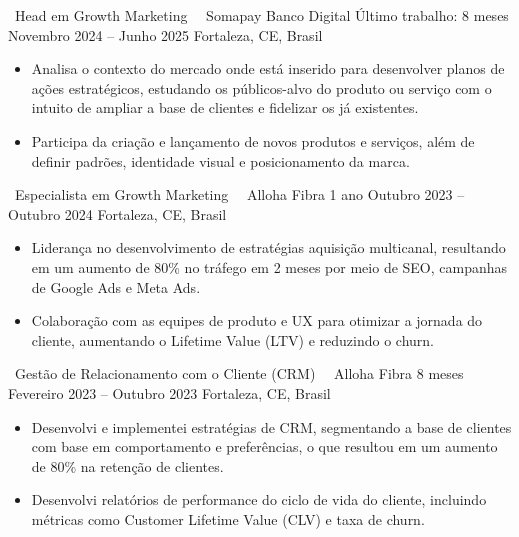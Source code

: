 
\cvevent
{\faPortrait\ Head em Growth Marketing\ \hfill \faAddressCard}
{\faDiscourse\ Somapay Banco Digital \hfill Último trabalho: 8 meses}
{Novembro 2024 -- Junho 2025}
{Fortaleza, CE, Brasil}
\begin{itemize}[leftmargin=*,itemsep=0.5em,topsep=0.5em]
	\item Analisa o contexto do mercado onde está inserido para desenvolver planos de ações estratégicos, estudando os públicos-alvo do produto ou serviço com o intuito de ampliar a base de clientes e fidelizar os já existentes.
	\item Participa da criação e lançamento de novos produtos e serviços, além de definir padrões, identidade visual e posicionamento da marca.
\end{itemize}
\divider
\cvevent
{\faChartLine\ Especialista em Growth Marketing\ \hfill \faAddressCard}
{\faQuinscape\ Alloha Fibra \hfill 1 ano}
{Outubro 2023 -- Outubro 2024}
{Fortaleza, CE, Brasil}
\begin{itemize}[leftmargin=*,itemsep=0.5em,topsep=0.5em]
	\item Liderança no desenvolvimento de estratégias aquisição multicanal,
	resultando em um aumento de 80\% no tráfego em 2 meses por meio de
	SEO, campanhas de Google Ads e Meta Ads.
	\item Colaboração com as equipes de produto e UX para otimizar a jornada do
	cliente, aumentando o Lifetime Value (LTV) e reduzindo o churn.
\end{itemize}
\divider
\cvevent
{\faHandshake[regular]\ Gestão de Relacionamento com o Cliente (CRM)\ \hfill \faAddressCard}
{\faQuinscape\ Alloha Fibra \hfill 8 meses}
{Fevereiro 2023 -- Outubro 2023}
{Fortaleza, CE, Brasil}
\begin{itemize}[leftmargin=*,itemsep=0.5em,topsep=0.5em]
	\item Desenvolvi e implementei estratégias de CRM, segmentando a base de
	clientes com base em comportamento e preferências, o que resultou em
	um aumento de 80\% na retenção de clientes.
	\item Desenvolvi relatórios de performance do ciclo de vida do cliente, incluindo
	métricas como Customer Lifetime Value (CLV) e taxa de churn.
\end{itemize}
